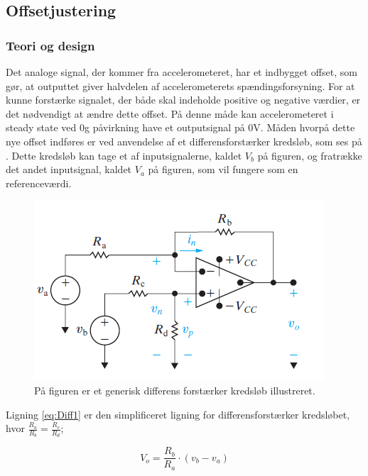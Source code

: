 \subsection{Offsetjustering}
\subsubsection{Teori og design}
Det analoge signal, der kommer fra accelerometeret, har et indbygget offset, som gør, at outputtet giver halvdelen af accelerometerets spændingsforsyning. For at kunne forstærke signalet, der både skal indeholde positive og negative værdier, er det nødvendigt at ændre dette offset. På denne måde kan  accelerometeret i steady state ved $0$g påvirkning have et outputsignal på $0$V. Måden hvorpå dette nye offset indføres er ved anvendelse af et differensforstærker kredsløb, som ses på . Dette kredsløb kan tage et af inputsignalerne, kaldet $V_{b}$ på figuren, og  fratrække det andet inputsignal, kaldet $V_{a}$ på figuren, som vil fungere som en referenceværdi.

\begin{figure}[H]
\centering
\includegraphics[scale=1.3]{figures/cProblemloesning/Differensforstaerker_generisk.png}
\caption{På figuren er et generisk differens forstærker kredsløb illustreret. \cite{Nilsson2011}}
\label{fig:Differensforstaerker_generisk}
\end{figure}

\noindent Ligning \ref{eq:Diff1} er den simplificeret ligning for differensforstærker kredsløbet, hvor $\frac{R_a}{R_b} = \frac{R_c}{R_d}$;

\begin{equation}\label{eq:Diff1}
V_o = \frac{R_b}{R_a} \cdot (v_b - v_a)
\end{equation}

